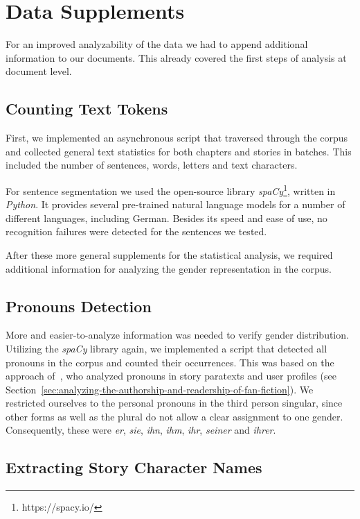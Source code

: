 \chapter{Data Supplements}\label{ch:data-supplements}

For an improved analyzability of the data we had to append additional information to our documents.
This already covered the first steps of analysis at document level.


\section{Counting Text Tokens}\label{sec:counting-text-tokens}

First, we implemented an asynchronous script that traversed through the corpus and collected general text statistics for both chapters and stories in batches.
This included the number of sentences, words, letters and text characters.

For sentence segmentation we used the open-source library \emph{spaCy}\footnote{https://spacy.io/}, written in \emph{Python}.
It provides several pre-trained natural language models for a number of different languages, including German.
Besides its speed and ease of use, no recognition failures were detected for the sentences we tested.

After these more general supplements for the statistical analysis, we required additional information for analyzing the gender representation in the corpus.


\section{Pronouns Detection}\label{sec:pronouns-detection}

More and easier-to-analyze information was needed to verify gender distribution.
Utilizing the \emph{spaCy} library again, we implemented a script that detected all pronouns in the corpus and counted their occurrences.
This was based on the approach of~\cite{Duggan2020WhoAO3}, who analyzed pronouns in story paratexts and user profiles (see Section~\ref{sec:analyzing-the-authorship-and-readership-of-fan-fiction}).
We restricted ourselves to the personal pronouns in the third person singular, since other forms as well as the plural do not allow a clear assignment to one gender.
Consequently, these were \emph{er}, \emph{sie}, \emph{ihn}, \emph{ihm}, \emph{ihr}, \emph{seiner} and \emph{ihrer}.


\section{Extracting Story Character Names}\label{sec:ner-token-classification}

